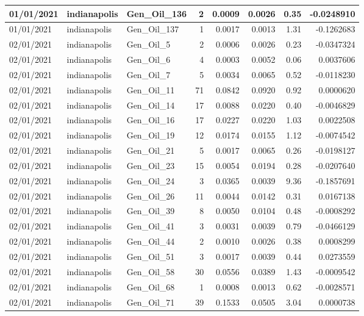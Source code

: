 \documentclass[
  letterpaper,
  DIV=11,
  numbers=noendperiod]{scrartcl}
\begin{document}
\begin{tabular}{l|l|l|r|r|r|r|r}
\hline
01/01/2021 & indianapolis & Gen\_Oil\_136 & 2 & 0.0009 & 0.0026 & 0.35 & -0.0248910\\
\hline
01/01/2021 & indianapolis & Gen\_Oil\_137 & 1 & 0.0017 & 0.0013 & 1.31 & -0.1262683\\
\hline
02/01/2021 & indianapolis & Gen\_Oil\_5 & 2 & 0.0006 & 0.0026 & 0.23 & -0.0347324\\
\hline
02/01/2021 & indianapolis & Gen\_Oil\_6 & 4 & 0.0003 & 0.0052 & 0.06 & 0.0037606\\
\hline
02/01/2021 & indianapolis & Gen\_Oil\_7 & 5 & 0.0034 & 0.0065 & 0.52 & -0.0118230\\
\hline
02/01/2021 & indianapolis & Gen\_Oil\_11 & 71 & 0.0842 & 0.0920 & 0.92 & 0.0000620\\
\hline
02/01/2021 & indianapolis & Gen\_Oil\_14 & 17 & 0.0088 & 0.0220 & 0.40 & -0.0046829\\
\hline
02/01/2021 & indianapolis & Gen\_Oil\_16 & 17 & 0.0227 & 0.0220 & 1.03 & 0.0022508\\
\hline
02/01/2021 & indianapolis & Gen\_Oil\_19 & 12 & 0.0174 & 0.0155 & 1.12 & -0.0074542\\
\hline
02/01/2021 & indianapolis & Gen\_Oil\_21 & 5 & 0.0017 & 0.0065 & 0.26 & -0.0198127\\
\hline
02/01/2021 & indianapolis & Gen\_Oil\_23 & 15 & 0.0054 & 0.0194 & 0.28 & -0.0207640\\
\hline
02/01/2021 & indianapolis & Gen\_Oil\_24 & 3 & 0.0365 & 0.0039 & 9.36 & -0.1857691\\
\hline
02/01/2021 & indianapolis & Gen\_Oil\_26 & 11 & 0.0044 & 0.0142 & 0.31 & 0.0167138\\
\hline
02/01/2021 & indianapolis & Gen\_Oil\_39 & 8 & 0.0050 & 0.0104 & 0.48 & -0.0008292\\
\hline
02/01/2021 & indianapolis & Gen\_Oil\_41 & 3 & 0.0031 & 0.0039 & 0.79 & -0.0466129\\
\hline
02/01/2021 & indianapolis & Gen\_Oil\_44 & 2 & 0.0010 & 0.0026 & 0.38 & 0.0008299\\
\hline
02/01/2021 & indianapolis & Gen\_Oil\_51 & 3 & 0.0017 & 0.0039 & 0.44 & 0.0273559\\
\hline
02/01/2021 & indianapolis & Gen\_Oil\_58 & 30 & 0.0556 & 0.0389 & 1.43 & -0.0009542\\
\hline
02/01/2021 & indianapolis & Gen\_Oil\_68 & 1 & 0.0008 & 0.0013 & 0.62 & -0.0028571\\
\hline
02/01/2021 & indianapolis & Gen\_Oil\_71 & 39 & 0.1533 & 0.0505 & 3.04 & 0.0000738\\

\end{tabular}
\end{document}
